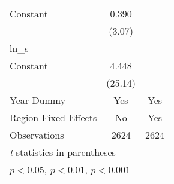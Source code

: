 {\begin{longtable}{l*{2}{c}}
Constant            &       0.390\sym{**} &                     \\
                    &      (3.07)         &                     \\
\hline
ln\_s                &                     &                     \\
Constant            &       4.448\sym{***}&                     \\
                    &     (25.14)         &                     \\
[1em]
Year Dummy          &         Yes         &         Yes         \\
[1em]
Region Fixed Effects &          No         &         Yes         \\
\hline
Observations        &        2624         &        2624         \\
\hline\hline
\multicolumn{3}{l}{\footnotesize \textit{t} statistics in parentheses}\\
\multicolumn{3}{l}{\footnotesize \sym{*} \(p<0.05\), \sym{**} \(p<0.01\), \sym{***} \(p<0.001\)}\\
\end{longtable}
}
